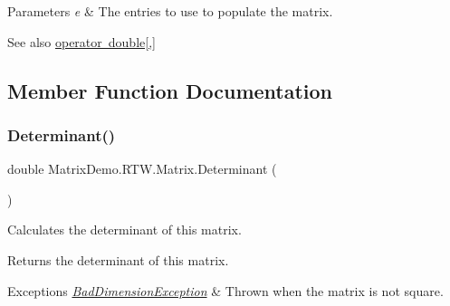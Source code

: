 \begin{DoxyParams}{Parameters}
{\em e} & The entries to use to populate the matrix.\\
\hline
\end{DoxyParams}
\begin{DoxySeeAlso}{See also}
\mbox{\hyperlink{class_matrix_demo_1_1_r_t_w_1_1_matrix_ac23641ac04b3c3baf14174bdf9049db2}{operator double\mbox{[},\mbox{]}}}


\end{DoxySeeAlso}


\subsection{Member Function Documentation}
\mbox{\label{class_matrix_demo_1_1_r_t_w_1_1_matrix_a1bf322e5e6ff6ae935c74a91df5bb51c}} 
\subsubsection{\texorpdfstring{Determinant()}{Determinant()}}
{\footnotesize\ttfamily double Matrix\+Demo.\+R\+T\+W.\+Matrix.\+Determinant (\begin{DoxyParamCaption}{ }\end{DoxyParamCaption})}



Calculates the determinant of this matrix. 

\begin{DoxyReturn}{Returns}
the determinant of this matrix.
\end{DoxyReturn}

\begin{DoxyExceptions}{Exceptions}
{\em \mbox{\hyperlink{class_matrix_demo_1_1_r_t_w_1_1_bad_dimension_exception}{Bad\+Dimension\+Exception}}} & Thrown when the matrix is not square.\\
\hline
\end{DoxyExceptions}
\mbox{\label{class_matrix_demo_1_1_r_t_w_1_1_matrix_ac0f3f4cf1a7f5d36aff55a94d7ae6c92}} 
